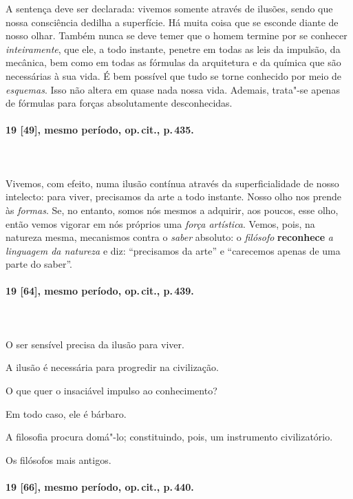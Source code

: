 A sentença deve ser declarada: vivemos somente através de ilusões, sendo
que nossa consciência dedilha a superfície. Há muita coisa que se
esconde diante de nosso olhar. Também nunca se deve temer que o homem
termine por se conhecer \textit{inteiramente}, que ele, a todo
instante, penetre em todas as leis da impulsão, da mecânica, bem como
em todas as fórmulas da arquitetura e da química que são necessárias à
sua vida. É bem possível que tudo se torne conhecido por meio de
\textit{esquemas}. Isso não altera em quase nada nossa vida. Ademais,
trata"-se apenas de fórmulas para forças absolutamente desconhecidas.

\pagebreak

\paragraph*{19 [49], mesmo período, op.\,cit., p.\,435.}
\ \\
\ \\

Vivemos, com efeito, numa ilusão contínua através da superficialidade de
nosso intelecto: para viver, precisamos da arte a todo instante. Nosso
olho nos prende às \textit{formas}. Se, no entanto, somos nós mesmos 
a adquirir, aos poucos, esse olho, então vemos vigorar em nós próprios
uma \textit{força artística}. Vemos, pois, na natureza mesma,
mecanismos contra o \textit{saber} absoluto: o \textit{filósofo}
\textbf{reconhece} \textit{a linguagem da natureza} e diz: “precisamos da
arte” e “carecemos apenas de uma parte do saber”. 

\pagebreak
\paragraph*{19 [64], mesmo período, op.\,cit., p.\,439.}
\ \\
\ \\

O ser sensível precisa da ilusão para viver.

A ilusão é necessária para progredir na civilização.

O que quer o insaciável impulso ao conhecimento?

Em todo caso, ele é bárbaro.

A filosofia procura domá"-lo; constituindo, pois, um instrumento
civilizatório.

Os filósofos mais antigos. 

\pagebreak
\paragraph*{19 [66], mesmo período, op.\,cit., p.\,440.}
\ \\
\ \\

